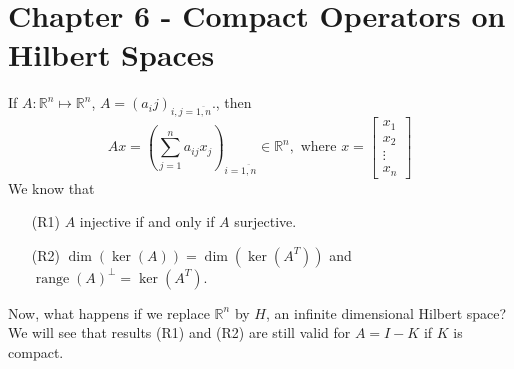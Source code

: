 \documentclass[12pt]{article}
\newcommand{\R}{{\mathbb R}}
\DeclareMathOperator{\range}{range}
\newcommand{\ov}{\overline}
\begin{document}
\section*{Chapter 6 - Compact Operators on Hilbert Spaces}
\setcounter{theorem}{0}
 \setcounter{proposition}{0}
  \setcounter{definition}{0}
 \setcounter{corollary}{0}
 \setcounter{cons}{0}
 \setcounter{equation}{0}
 \setcounter{lemma}{0}
If $A: \R^n \mapsto \R^n$, $A = (a_ij)_{i, j = \ov{1, n}}$., then 
\[ Ax = \left( \sum\limits_{j =1}^n a_{ij} x_j \right)_{i = \ov{1, n}} \in \R^n, \text{ where } x = \left[ \begin{matrix}
x_1 \\
x_2 \\
\vdots \\
x_n
\end{matrix}\right]\]
We know that 
\begin{enumerate}[topsep=-15pt, itemsep=0pt]
\item[(R1)] $A$ injective if and only if $A$ surjective. 
\item[(R2)] $\dim(\ker(A)) = \dim(\ker(A^{T}))$ and $\range(A)^{\perp} = \ker(A^T)$.
\end{enumerate}
Now, what happens if we replace $\R^n$ by $H$, an infinite dimensional Hilbert space? We will see that results (R1) and (R2) are still valid for $A = I - K$ if $K$ is compact. 
\end{document}
